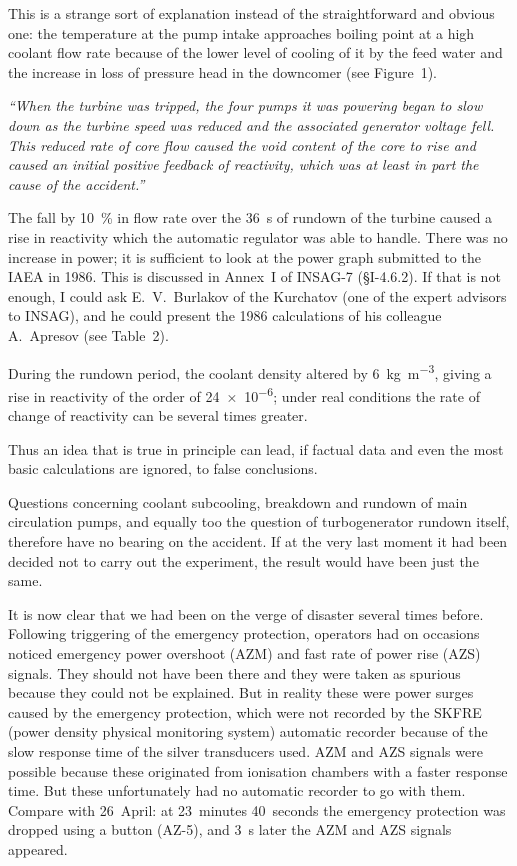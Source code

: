 \documentclass[openright]{bookest}
\begin{document}
This is a strange sort of explanation instead of the straightforward and obvious one: the temperature at the pump intake approaches boiling point at a high coolant flow rate because of the lower level of cooling of it by the feed water and the increase in loss of pressure head in the downcomer (see Figure~1).

\begin{personal}[INSAG-7 (§2.9):]
\textit{``When the turbine was tripped, the four pumps it was powering began to slow down as the turbine speed was reduced and the associated generator voltage fell. This reduced rate of core flow caused the void content of the core to rise and caused an initial positive feedback of reactivity, which was at least in part the cause of the accident.''}
\end{personal}

The fall by \qty{10}{\percent} in flow rate over the \qty{36}{\second} of rundown of the turbine caused a rise in reactivity which the automatic regulator was able to handle. There was no increase in power; it is sufficient to look at the power graph submitted to the IAEA in 1986. This is discussed in Annex~I of INSAG-7 (§I-4.6.2). If that is not enough, I could ask E.~V.~Burlakov of the Kurchatov (one of the expert advisors to INSAG), and he could present the 1986 calculations of his colleague A.~Apresov (see Table~2).

During the rundown period, the coolant density altered by \qty{6}{\kilogram\per\meter\cubed}, giving a rise in reactivity of the order of \num{24e-6}; under real conditions the rate of change of reactivity can be several times greater.

Thus an idea that is true in principle can lead, if factual data and even the most basic calculations are ignored, to false conclusions.

Questions concerning coolant subcooling, breakdown and rundown of main circulation pumps, and equally too the question of turbogenerator rundown itself, therefore have no bearing on the accident. If at the very last moment it had been decided not to carry out the experiment, the result would have been just the same.

It is now clear that we had been on the verge of disaster several times before. Following triggering of the emergency protection, operators had on occasions noticed emergency power overshoot (AZM) and fast rate of power rise (AZS) signals. They should not have been there and they were taken as spurious because they could not be explained. But in reality these were power surges caused by the emergency protection, which were not recorded by the SKFRE (power density physical monitoring system) automatic recorder because of the slow response time of the silver transducers used. AZM and AZS signals were possible because these originated from ionisation chambers with a faster response time. But these unfortunately had no automatic recorder to go with them. Compare with 26~April: at 23~minutes 40~seconds the emergency protection was dropped using a button (AZ-5), and \qty{3}{\second} later the AZM and AZS signals appeared.
\end{document}
